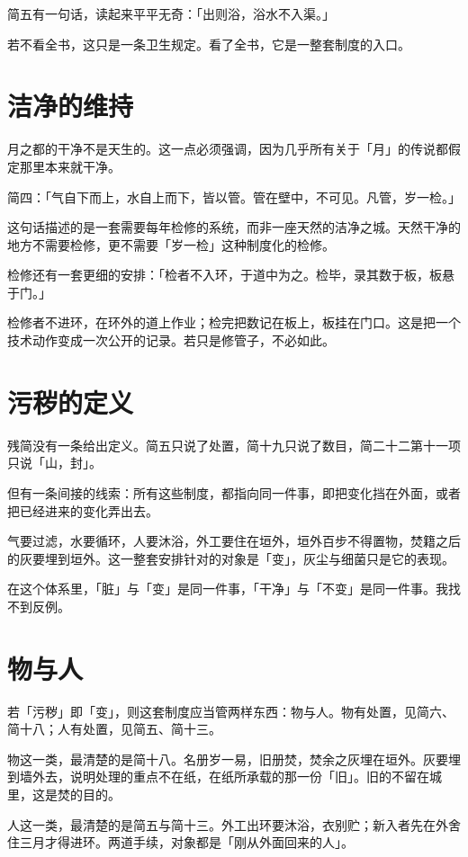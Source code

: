 简五有一句话，读起来平平无奇：「出则浴，浴水不入渠。」

若不看全书，这只是一条卫生规定。看了全书，它是一整套制度的入口。

\section{洁净的维持}

月之都的干净不是天生的。这一点必须强调，因为几乎所有关于「月」的传说都假定那里本来就干净。

简四：「气自下而上，水自上而下，皆以管。管在壁中，不可见。凡管，岁一检。」

这句话描述的是一套需要每年检修的系统，而非一座天然的洁净之城。天然干净的地方不需要检修，更不需要「岁一检」这种制度化的检修。

检修还有一套更细的安排：「检者不入环，于道中为之。检毕，录其数于板，板悬于门。」

检修者不进环，在环外的道上作业；检完把数记在板上，板挂在门口。这是把一个技术动作变成一次公开的记录。若只是修管子，不必如此。

\section{污秽的定义}

残简没有一条给出定义。简五只说了处置，简十九只说了数目，简二十二第十一项只说「山，封」。

但有一条间接的线索：所有这些制度，都指向同一件事，即把变化挡在外面，或者把已经进来的变化弄出去。

气要过滤，水要循环，人要沐浴，外工要住在垣外，垣外百步不得置物，焚籍之后的灰要埋到垣外。这一整套安排针对的对象是「变」，灰尘与细菌只是它的表现。

在这个体系里，「脏」与「变」是同一件事，「干净」与「不变」是同一件事。我找不到反例。

\section{物与人}

若「污秽」即「变」，则这套制度应当管两样东西：物与人。物有处置，见简六、简十八；人有处置，见简五、简十三。

物这一类，最清楚的是简十八。名册岁一易，旧册焚，焚余之灰埋在垣外。灰要埋到墙外去，说明处理的重点不在纸，在纸所承载的那一份「旧」。旧的不留在城里，这是焚的目的。

人这一类，最清楚的是简五与简十三。外工出环要沐浴，衣别贮；新入者先在外舍住三月才得进环。两道手续，对象都是「刚从外面回来的人」。

